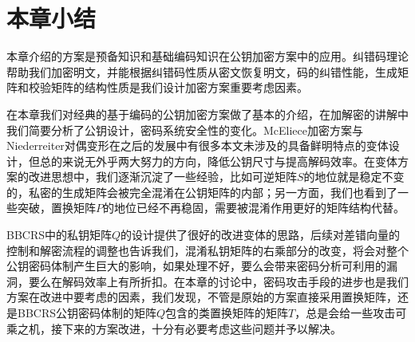 \section{本章小结}
本章介绍的方案是预备知识和基础编码知识在公钥加密方案中的应用。纠错码理论帮助我们加密明文，并能根据纠错码性质从密文恢复明文，码的纠错性能，生成矩阵和校验矩阵的结构性质是我们设计加密方案重要考虑因素。

在本章我们对经典的基于编码的公钥加密方案做了基本的介绍，在加解密的讲解中我们简要分析了公钥设计，密码系统安全性的变化。McEliece加密方案与Niederreiter对偶变形在之后的发展中有很多本文未涉及的具备鲜明特点的变体设计，但总的来说无外乎两大努力的方向，降低公钥尺寸与提高解码效率。在变体方案的改进思想中，我们逐渐沉淀了一些经验，比如可逆矩阵$S$的地位就是稳定不变的，私密的生成矩阵会被完全混淆在公钥矩阵的内部；另一方面，我们也看到了一些突破，置换矩阵$P$的地位已经不再稳固，需要被混淆作用更好的矩阵结构代替。

BBCRS中的私钥矩阵$Q$的设计提供了很好的改进变体的思路，后续对差错向量的控制和解密流程的调整也告诉我们，混淆私钥矩阵的右乘部分的改变，将会对整个公钥密码体制产生巨大的影响，如果处理不好，要么会带来密码分析可利用的漏洞，要么在解码效率上有所折扣。在本章的讨论中，密码攻击手段的进步也是我们方案在改进中要考虑的因素，我们发现，不管是原始的方案直接采用置换矩阵，还是BBCRS公钥密码体制的矩阵$Q$包含的类置换矩阵的矩阵$T$，总是会给一些攻击可乘之机，接下来的方案改进，十分有必要考虑这些问题并予以解决。